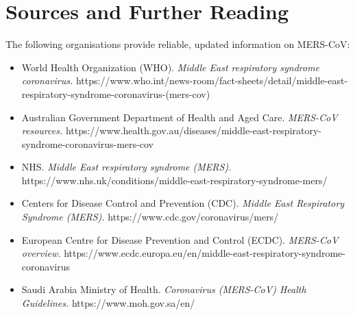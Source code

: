 \section*{Sources and Further Reading}
The following organisations provide reliable, updated information on MERS-CoV:
\begin{itemize}
    \item World Health Organization (WHO). \textit{Middle East respiratory syndrome coronavirus.} https://www.who.int/news-room/fact-sheets/detail/middle-east-respiratory-syndrome-coronavirus-(mers-cov)
    \item Australian Government Department of Health and Aged Care. \textit{MERS-CoV resources.} https://www.health.gov.au/diseases/middle-east-respiratory-syndrome-coronavirus-mers-cov
    \item NHS. \textit{Middle East respiratory syndrome (MERS).} https://www.nhs.uk/conditions/middle-east-respiratory-syndrome-mers/
    \item Centers for Disease Control and Prevention (CDC). \textit{Middle East Respiratory Syndrome (MERS).} https://www.cdc.gov/coronavirus/mers/
    \item European Centre for Disease Prevention and Control (ECDC). \textit{MERS-CoV overview.} https://www.ecdc.europa.eu/en/middle-east-respiratory-syndrome-coronavirus
    \item Saudi Arabia Ministry of Health. \textit{Coronavirus (MERS-CoV) Health Guidelines.} https://www.moh.gov.sa/en/
\end{itemize}
